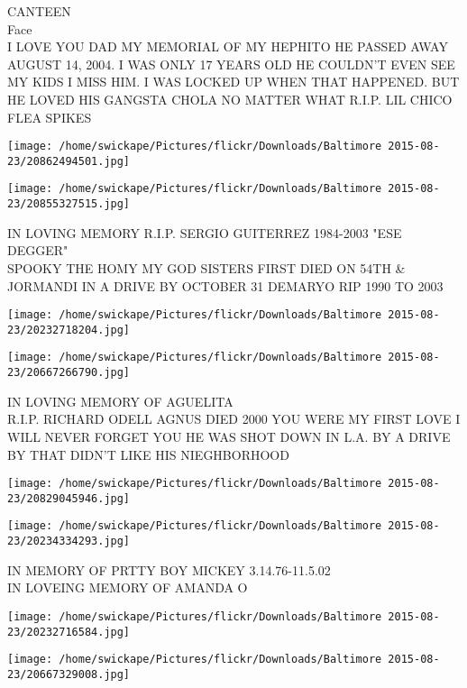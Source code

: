 \documentclass[10pt,letterpaper]{article}
\begin{document}
CANTEEN\\
Face\\
I LOVE YOU DAD MY MEMORIAL OF MY HEPHITO HE PASSED AWAY AUGUST 14, 2004.  I WAS ONLY 17 YEARS OLD HE COULDN'T EVEN SEE MY KIDS I MISS HIM.  I WAS LOCKED UP WHEN THAT HAPPENED.  BUT HE LOVED HIS GANGSTA CHOLA NO MATTER WHAT R.I.P. LIL CHICO FLEA SPIKES
\pagebreak

\texttt{[image: /home/swickape/Pictures/flickr/Downloads/Baltimore 2015-08-23/20862494501.jpg]}

\vspace{0.25in}
\texttt{[image: /home/swickape/Pictures/flickr/Downloads/Baltimore 2015-08-23/20855327515.jpg]}

IN LOVING MEMORY R.I.P. SERGIO GUITERREZ 1984{-}2003 "ESE DEGGER"\\
SPOOKY THE HOMY MY GOD SISTERS FIRST DIED ON 54TH \& JORMANDI IN A DRIVE BY OCTOBER 31 DEMARYO RIP 1990 TO 2003
\pagebreak

\texttt{[image: /home/swickape/Pictures/flickr/Downloads/Baltimore 2015-08-23/20232718204.jpg]}

\vspace{0.25in}
\texttt{[image: /home/swickape/Pictures/flickr/Downloads/Baltimore 2015-08-23/20667266790.jpg]}

IN LOVING MEMORY OF AGUELITA\\
R.I.P. RICHARD ODELL AGNUS DIED 2000 YOU WERE MY FIRST LOVE I WILL NEVER FORGET YOU HE WAS SHOT DOWN IN L.A. BY A DRIVE BY THAT DIDN'T LIKE HIS NIEGHBORHOOD
\pagebreak

\texttt{[image: /home/swickape/Pictures/flickr/Downloads/Baltimore 2015-08-23/20829045946.jpg]}

\vspace{0.25in}
\texttt{[image: /home/swickape/Pictures/flickr/Downloads/Baltimore 2015-08-23/20234334293.jpg]}

IN MEMORY OF PRTTY BOY MICKEY 3.14.76{-}11.5.02\\
IN LOVEING MEMORY OF AMANDA O
\pagebreak

\texttt{[image: /home/swickape/Pictures/flickr/Downloads/Baltimore 2015-08-23/20232716584.jpg]}

\vspace{0.25in}
\texttt{[image: /home/swickape/Pictures/flickr/Downloads/Baltimore 2015-08-23/20667329008.jpg]}
\end{document}
